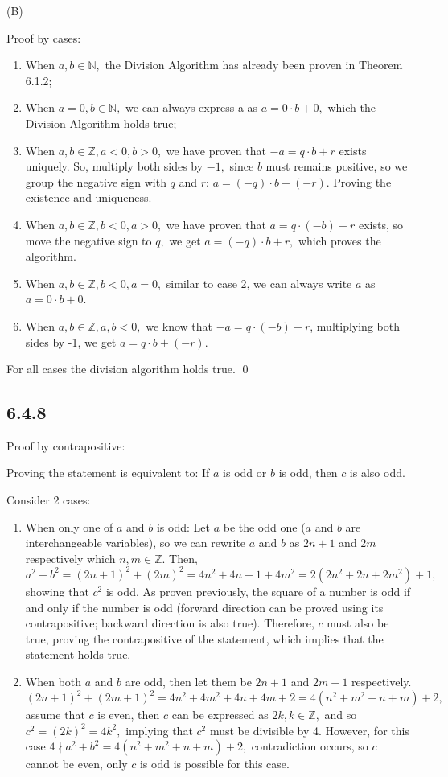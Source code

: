 \documentclass{article}
\begin{document}
(B)

Proof by cases:

\begin{enumerate}
    \item When $a,b\in\mathbb{N},$ the Division Algorithm has already been proven in Theorem 6.1.2;
    \item When $a=0,b\in\mathbb{N},$ we can always express a as $a=0\cdot b+0,$ which the Division Algorithm holds true;
    \item  When $a,b\in\mathbb{Z},a<0,b>0,$  we have proven that $-a=q\cdot b+r$ exists uniquely. So, multiply both sides by $-1,$ since $b$ must remains positive, so we group the negative sign with $q$ and $r$: $a=(-q)\cdot b+(-r)$. Proving the existence and uniqueness. 
    \item When $a,b\in\mathbb{Z}, b<0, a>0,$ we have proven that $a=q\cdot (-b)+r$ exists, so move the negative sign to $q,$ we get $a=(-q)\cdot b+r,$ which proves the algorithm.
    \item When $a,b\in\mathbb{Z}, b<0, a=0,$ similar to case 2, we can always write $a$ as $a=0\cdot b+0$.
    \item When $a,b\in\mathbb{Z},a,b<0,$ we know that $-a=q\cdot (-b)+r$, multiplying both sides by -1, we get $a=q\cdot b+(-r)$. 
\end{enumerate}
For all cases the division algorithm holds true. \qed

\subsection*{6.4.8}

Proof by contrapositive:

Proving the statement is equivalent to: If $a$ is odd or $b$ is odd, then $c$ is also odd.

Consider 2 cases:
\begin{enumerate}
    \item When only one of $a$ and $b$ is odd: Let $a$ be the odd one ($a$ and $b$ are interchangeable variables), so we can rewrite $a$ and $b$ as $2n+1$ and $2m$ respectively which $n,m\in\mathbb{Z}$. Then, $$a^2+b^2=(2n+1)^2+(2m)^2=4n^2+4n+1+4m^2=2(2n^2+2n+2m^2)+1,$$ showing that $c^2$ is odd. As proven previously, the square of a number is odd if and only if the number is odd (forward direction can be proved using its contrapositive; backward direction is also true). Therefore, $c$ must also be true, proving the contrapositive of the statement, which implies that the statement holds true. 
    \item When both $a$ and $b$ are odd, then let them be $2n+1$ and $2m+1$ respectively. $$(2n+1)^2+(2m+1)^2=4n^2+4m^2+4n+4m+2=4(n^2+m^2+n+m)+2,$$ assume that $c$ is even, then $c$ can be expressed as $2k,k\in\mathbb{Z},$ and so $c^2=(2k)^2=4k^2,$ implying that $c^2$ must be divisible by 4. However, for this case $ 4\nmid a^2+b^2=4(n^2+m^2+n+m)+2,$ contradiction occurs, so $c$ cannot be even, only $c$ is odd is possible for this case.
\end{enumerate}
\end{document}
